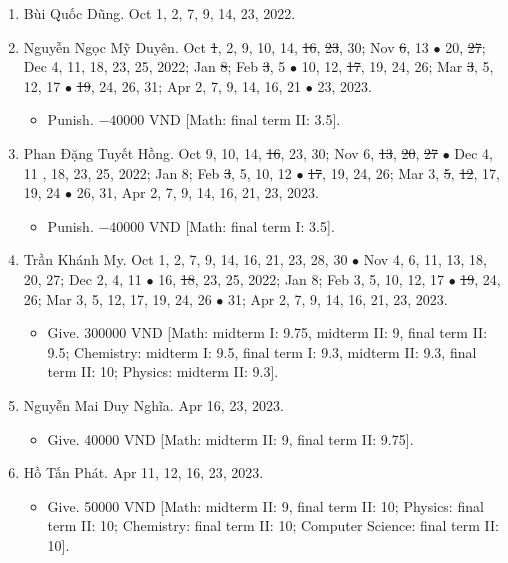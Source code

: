 \documentclass{article}
\begin{document}
\begin{enumerate}
	\item {\sc Bùi Quốc Dũng.} {\sf[In]} Oct 1, 2, 7, 9, 14, 23, 2022. {\sf[Out]}
	\item {\sc Nguyễn Ngọc Mỹ Duyên.} {\sf[In]} Oct \st{1}, 2, 9, 10, 14, \st{16}, \st{23}, 30; Nov \st{6}, 13 $\bullet$ 20, \st{27}; Dec 4, 11, 18, 23, 25, 2022; Jan \st{8}; Feb \st{3}, 5 $\bullet$ 10, 12, \st{17}, 19, 24, 26; Mar \st{3}, 5, 12, 17 $\bullet$ \st{19}, 24, 26, 31; Apr 2, 7, 9, 14, 16, 21 $\bullet$ 23, 2023.
	\begin{itemize}
		\item {\sf Punish.} $-40000$ VND [Math: final term II: 3.5].
	\end{itemize}
	\item {\sc Phan Đặng Tuyết Hồng.} {\sf[In]} Oct 9, 10, 14, \st{16}, 23, 30; Nov 6, \st{13}, \st{20}, \st{27} $\bullet$ Dec 4, 11 , 18, 23, 25, 2022; Jan 8; Feb \st{3}, 5, 10, 12 $\bullet$ \st{17}, 19, 24, 26; Mar 3, \st{5}, \st{12}, 17, 19, 24 $\bullet$ 26, 31, Apr 2, 7, 9, 14, 16, 21, 23, 2023.
	\begin{itemize}
		\item {\sf Punish.} $-40000$ VND [Math: final term I: 3.5].
	\end{itemize}
	\item {\sc Trần Khánh My.} {\sf[In]} Oct 1, 2, 7, 9, 14, 16, 21, 23, 28, 30 $\bullet$ Nov 4, 6, 11, 13, 18, 20, 27; Dec 2, 4, 11 $\bullet$ 16, \st{18}, 23, 25, 2022; Jan 8; Feb 3, 5, 10, 12, 17 $\bullet$ \st{19}, 24, 26; Mar 3, 5, 12, 17, 19, 24, 26 $\bullet$ 31; Apr 2, 7, 9, 14, 16, 21, 23, 2023.
	\begin{itemize}
		\item {\sf Give.} 300000 VND [Math: midterm I: 9.75, midterm II: 9, final term II: 9.5;  Chemistry: midterm I: 9.5, final term I: 9.3, midterm II: 9.3, final term II: 10; Physics: midterm II: 9.3].
	\end{itemize}
	\item {\sc Nguyễn Mai Duy Nghĩa.} {\sf[In]} Apr 16, 23, 2023.
	\begin{itemize}
		\item {\sf Give.} 40000 VND [Math: midterm II: 9, final term II: 9.75].
	\end{itemize}
	\item {\sc Hồ Tấn Phát.} {\sf[In]} Apr 11, 12, 16, 23, 2023.
	\begin{itemize}
		\item {\sf Give.} 50000 VND [Math: midterm II: 9, final term II: 10; Physics: final term II: 10; Chemistry: final term II: 10; Computer Science: final term II: 10].

\end{itemize}
\end{enumerate}
\end{document}
